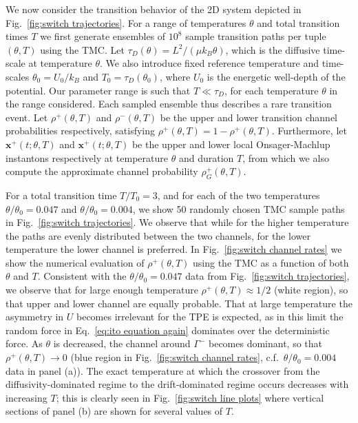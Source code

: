 We now consider the transition behavior of the 2D
system depicted in Fig.~\ref{fig:switch trajectories}. For a range of temperatures
$\theta$ and total transition times $T$ we first generate ensembles
of $10^{8}$ sample transition paths per tuple $(\theta,T)$ using
the TMC. Let $\tau_{D}(\theta)=L^{2}/(\mu k_{B}\theta)$, which is
the diffusive time-scale at temperature $\theta$. We also introduce
fixed reference temperature and time-scales $\theta_{0}=U_{0}/k_{B}$
and $T_{0}=\tau_{D}(\theta_{0})$, where $U_{0}$ is the energetic
well-depth of the potential. Our parameter range is such that $T\ll\tau_{D}$,
for each temperature $\theta$ in the range considered. Each sampled
ensemble thus describes a rare transition event. Let $\rho^{+}(\theta,T)$ and  $\rho^{-}(\theta,T)$ be the upper and lower transition channel probabilities respectively, satisfying  $\rho^{+}(\theta,T)= 1 - \rho^{+}(\theta,T)$. Furthermore, let $\mathbf{x}^+(t;\theta, T)$ and $\mathbf{x}^+(t;\theta, T)$ be the upper and lower local Onsager-Machlup instantons respectively at temperature $\theta$ and duration $T$, from which we also compute the approximate channel probability $\rho_G^{+}(\theta,T)$.

For a total transition time $T/T_{0}=3$, and for each of the two temperatures $\theta/\theta_{0}=0.047$
and $\theta/\theta_{0}=0.004$, we show 50 randomly chosen TMC sample
paths in Fig.~\ref{fig:switch trajectories}. We observe that while for the
higher temperature the paths are evenly distributed between the two
channels, for the lower temperature the lower channel is preferred. In Fig.~\ref{fig:switch channel rates} we show the numerical evaluation of $\rho^{+}(\theta,T)$ using the TMC as a function of both $\theta$
and $T$. Consistent with the $\theta/\theta_{0}=0.047$ data from
Fig.~\ref{fig:switch trajectories}, we observe that for large enough temperature
$\rho^{+}(\theta,T)\approx1/2$ (white region), so that upper and lower
channel are equally probable. That at large temperature the asymmetry
in $U$ becomes irrelevant for the TPE is expected, as in this limit
the random force in Eq.~\ref{eq:ito equation again} dominates over the
deterministic force. As $\theta$ is decreased, the channel around
$\Gamma^{-}$ becomes dominant, so that $\rho^{+}(\theta,T) \rightarrow 0$
(blue region in Fig.~\ref{fig:switch channel rates}, c.f.~$\theta/\theta_{0}=0.004$
data in panel (a)). The exact temperature at which the crossover
from the diffusivity-dominated regime to the drift-dominated regime
occurs decreases with increasing $T$; this is clearly seen in Fig.~\ref{fig:switch line plots} where vertical sections of panel (b) are shown for several values
of $T$.

